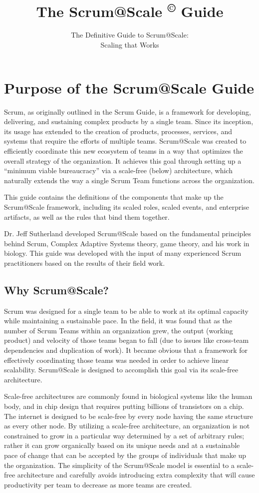 \documentclass[12pt,a4paper,parskip=full]{scrartcl}
\title{\Huge{\color{red}\textbf{The Scrum@Scale 
\textsuperscript{\copyright} 
Guide}}}
\subtitle{\color{gray}The Definitive Guide to Scrum@Scale:\\ Scaling that Works}
\date{}
\begin{document}

\section{Purpose of the Scrum@Scale Guide}

Scrum, as originally outlined in the Scrum Guide, is a framework for developing, delivering, and sustaining complex products by a single team. Since its inception, its usage has extended to the creation of products, processes, services, and systems that require the efforts of multiple teams. Scrum@Scale was created to efficiently coordinate this new ecosystem of teams in a way that optimizes the overall strategy of the organization. It achieves this goal through setting up a ``minimum viable bureaucracy'' via a scale-free (below) architecture, which naturally extends the way a single Scrum Team functions across the organization.

This guide contains the definitions of the components that make up the Scrum@Scale framework, including its scaled roles, scaled events, and enterprise artifacts, as well as the rules that bind them together.

Dr. Jeff Sutherland developed Scrum@Scale based on the fundamental principles behind Scrum, Complex Adaptive Systems theory, game theory, and his work in biology. This guide was developed with the input of many experienced Scrum practitioners based on the results of their field work. 

\subsection{Why Scrum@Scale?}

Scrum was designed for a single team to be able to work at its optimal capacity while maintaining a sustainable pace. In the field, it was found that as the number of Scrum Teams within an organization grew, the output (working product) and velocity of those teams began to fall (due to issues like cross-team dependencies and duplication of work). It became obvious that a framework for effectively coordinating those teams was needed in order to achieve linear scalability. Scrum@Scale is designed to accomplish this goal via its scale-free architecture.

Scale-free architectures are commonly found in biological systems like the human body, and in chip design that requires putting billions of transistors on a chip. The internet is designed to be scale-free by every node having the same structure as every other node. By utilizing a scale-free architecture, an organization is not constrained to grow in a particular way determined by a set of arbitrary rules; rather it can grow organically based on its unique needs and at a sustainable pace of change that can be accepted by the groups of individuals that make up the organization. The simplicity of the Scrum@Scale model is essential to a scale-free architecture and carefully avoids introducing extra complexity that will cause productivity per team to decrease as more teams are created.
\end{document}
